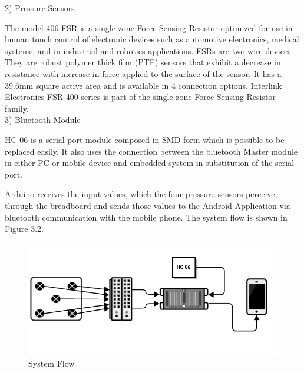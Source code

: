 \documentclass[conference]{IEEEtran}
\begin{document}
2)	Pressure Sensors

The model 406 FSR is a single-zone Force Sensing Resistor optimized for use in human touch control of electronic devices such as automotive electronics, medical systems, and in industrial and robotics applications. FSRs are two-wire devices. They are robust polymer thick film (PTF) sensors that exhibit a decrease in resistance with increase in force applied to the surface of the sensor. It has a 39.6mm square active area and is available in 4 connection options. Interlink Electronics FSR 400 series is part of the single zone Force Sensing Resistor family.\\

3)	Bluetooth Module

HC-06 is a serial port module composed in SMD form which is possible to be replaced easily. It also uses the connection between the bluetooth Master module in either PC or mobile device and embedded system in substitution of the serial port. 

Arduino receives the input values, which the four pressure sensors perceive, through the breadboard and sends those values to the Android Application via bluetooth communication with the mobile phone. The system flow is shown in Figure 3.2.\\

\begin{figure}[H]
\begin{center}
    \includegraphics[scale=0.4]{img_01.png}
    \caption{System Flow} 
\end{center}
\end{figure}
\end{document}
